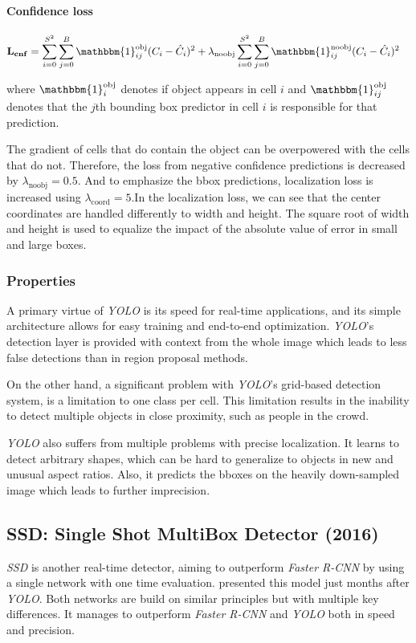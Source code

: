 \paragraph{Confidence loss}
\begin{align*}
\mathbf{L_{cnf}} &= \sum_{i=0}^{S^2} \sum_{j=0}^B \mathbbm{1}_{ij}^{\text{obj}} (C_i - \hat{C}_i)^2 
+ \lambda_{\text{noobj}} \sum_{i=0}^{S^2} \sum_{j=0}^B \mathbbm{1}_{ij}^{\text{noobj}} (C_i - \hat{C}_i)^2
\end{align*}

\noindent where $\mathbbm{1}^{\text{obj}}_i$ denotes if object appears in cell $i$ and $\mathbbm{1}^{\text{obj}}_{ij}$ denotes that the $j$th bounding box predictor in cell $i$ is responsible for that prediction.

The gradient of cells that do contain the object can be overpowered with the cells that do not.  Therefore, the loss from negative confidence predictions is decreased by $\lambda_{\text{noobj}} = 0.5$. And to emphasize the bbox predictions, localization loss is increased using $\lambda_{\text{coord}} = 5$.In the localization loss, we can see that the center coordinates are handled differently to width and height. The square root of width and height is used to equalize the impact of the absolute value of error in small and large boxes.


\subsubsection{Properties}
A primary virtue of \textit{YOLO} is its speed for real-time applications, and its simple architecture allows for easy training and end-to-end optimization. \textit{YOLO}'s detection layer is provided with context from the whole image which leads to less false detections than in region proposal methods. 

On the other hand, a significant problem with \textit{YOLO}'s grid-based detection system, is a limitation to one class per cell. This limitation results in the inability to detect multiple objects in close proximity, such as people in the crowd. 

\textit{YOLO} also suffers from multiple problems with precise localization. It learns to detect arbitrary shapes, which can be hard to generalize to objects in new and unusual aspect ratios. Also, it predicts the bboxes on the heavily down-sampled image which leads to further imprecision. 


\subsection{SSD: Single Shot MultiBox Detector (2016)}
\label{sec:ssd}
\textit{SSD} is another real-time detector, aiming to outperform \textit{Faster R-CNN} by using a single network with one time evaluation. \citeauthor{bib:ssd} \cite{bib:ssd} presented this model just months after \textit{YOLO}. Both networks are build on similar principles but with multiple key differences. It manages to outperform \textit{Faster R-CNN} and \textit{YOLO} both in speed and precision.

